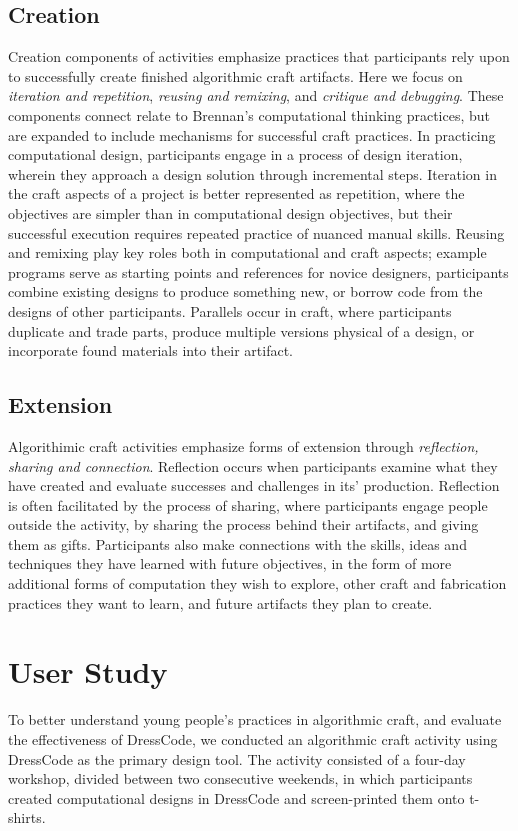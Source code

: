 \documentclass{sigchi}
\begin{document}
\subsection{Creation}
Creation components of activities emphasize practices that participants rely upon to successfully create finished algorithmic craft artifacts. Here we focus on \emph{iteration and repetition}, \emph{reusing and remixing}, and \emph{critique and debugging}. These components connect relate to Brennan's computational thinking practices, but are expanded to include mechanisms for successful craft practices. In practicing computational design, participants engage in a process of design iteration, wherein they approach a design solution through incremental steps. Iteration in the craft aspects of a project is better represented as repetition, where the objectives are simpler than in computational design objectives, but their successful execution requires repeated practice of nuanced manual skills. Reusing and remixing play key roles both in computational and craft aspects; example programs serve as starting points and references for novice designers, participants combine existing designs to produce something new, or borrow code from the designs of other participants. Parallels occur in craft, where participants duplicate and trade parts, produce multiple versions physical of a design, or incorporate found materials into their artifact.

\subsection{Extension}
Algorithimic craft activities emphasize forms of extension through \emph{reflection, sharing and connection}. Reflection occurs when participants examine what they have created and evaluate successes and challenges in its' production. Reflection is often facilitated by the process of sharing, where participants engage people outside the activity, by sharing the process behind their artifacts, and giving them as gifts. Participants also make connections with the skills, ideas and techniques they have learned with future objectives, in the form of more additional forms of computation they wish to explore, other craft and fabrication practices they want to learn, and future artifacts they plan to create. 

\section{User Study}
To better understand young people's practices in algorithmic craft, and evaluate the effectiveness of DressCode, we conducted an algorithmic craft activity using DressCode as the primary design tool. The activity consisted of a four-day workshop, divided between two consecutive weekends, in which participants created computational designs in DressCode and screen-printed them onto t-shirts.
\end{document}
